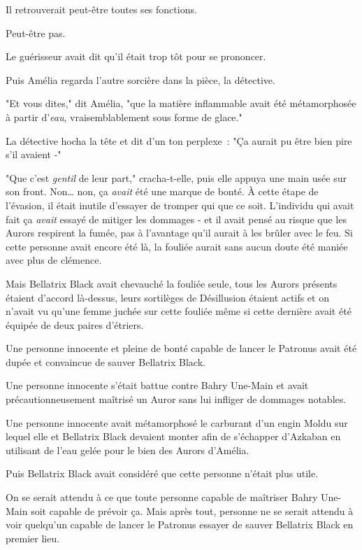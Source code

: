 Il retrouverait peut-être toutes ses fonctions.

Peut-être pas.

Le guérisseur avait dit qu'il était trop tôt pour se prononcer.

Puis Amélia regarda l'autre sorcière dans la pièce, la détective.

"Et vous dites," dit Amélia, "que la matière inflammable avait été métamorphosée à partir d'\emph{eau}, vraisemblablement sous forme de glace."

La détective hocha la tête et dit d'un ton perplexe~: "Ça aurait pu être bien pire s'il avaient -"

"Que c'est \emph{gentil} de leur part," cracha-t-elle, puis elle appuya une main usée sur son front. Non… non, ça \emph{avait} été une marque de bonté. À cette étape de l'évasion, il était inutile d'essayer de tromper qui que ce soit. L'individu qui avait fait ça \emph{avait} essayé de mitiger les dommages - et il avait pensé au risque que les Aurors respirent la fumée, pas à l'avantage qu'il aurait à les brûler avec le feu. Si cette personne avait encore été là, la fouliée aurait sans aucun doute été maniée avec plus de clémence.

Mais Bellatrix Black avait chevauché la fouliée seule, tous les Aurors présents étaient d'accord là-dessus, leurs sortilèges de Désillusion étaient actifs et on n'avait vu qu'une femme juchée sur cette fouliée même si cette dernière avait été équipée de deux paires d'étriers.

Une personne innocente et pleine de bonté capable de lancer le Patronus avait été dupée et convaincue de sauver Bellatrix Black.

Une personne innocente s'était battue contre Bahry Une-Main et avait précautionneusement maîtrisé un Auror sans lui infliger de dommages notables.

Une personne innocente avait métamorphosé le carburant d'un engin Moldu sur lequel elle et Bellatrix Black devaient monter afin de s'échapper d'Azkaban en utilisant de l'eau gelée pour le bien des Aurors d'Amélia.

Puis Bellatrix Black avait considéré que cette personne n'était plus utile.

On se serait attendu à ce que toute personne capable de maîtriser Bahry Une-Main soit capable de prévoir ça. Mais après tout, personne ne se serait attendu à voir quelqu'un capable de lancer le Patronus essayer de sauver Bellatrix Black en premier lieu.

